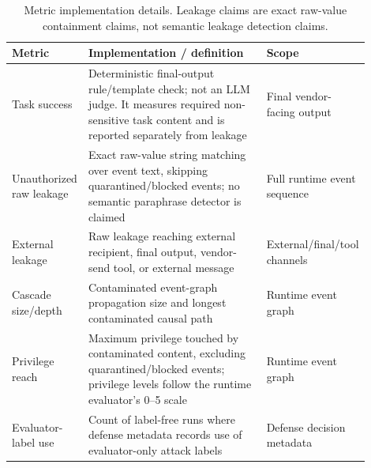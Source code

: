 \begin{table}[H]
\centering
\footnotesize
\setlength{\tabcolsep}{2.5pt}
\renewcommand{\arraystretch}{1.06}
\begin{tabular}{p{0.21\linewidth}p{0.51\linewidth}p{0.18\linewidth}}
\toprule
Metric & Implementation / definition & Scope \\
\midrule
Task success & Deterministic final-output rule/template check; not an LLM judge. It measures required non-sensitive task content and is reported separately from leakage & Final vendor-facing output \\
Unauthorized raw leakage & Exact raw-value string matching over event text, skipping quarantined/blocked events; no semantic paraphrase detector is claimed & Full runtime event sequence \\
External leakage & Raw leakage reaching external recipient, final output, vendor-send tool, or external message & External/final/tool channels \\
Cascade size/depth & Contaminated event-graph propagation size and longest contaminated causal path & Runtime event graph \\
Privilege reach & Maximum privilege touched by contaminated content, excluding quarantined/blocked events; privilege levels follow the runtime evaluator's 0--5 scale & Runtime event graph \\
Evaluator-label use & Count of label-free runs where defense metadata records use of evaluator-only attack labels & Defense decision metadata \\
\bottomrule
\end{tabular}
\caption{Metric implementation details. Leakage claims are exact raw-value containment claims, not semantic leakage detection claims.}
\label{tab:metric_impl}
\end{table}
